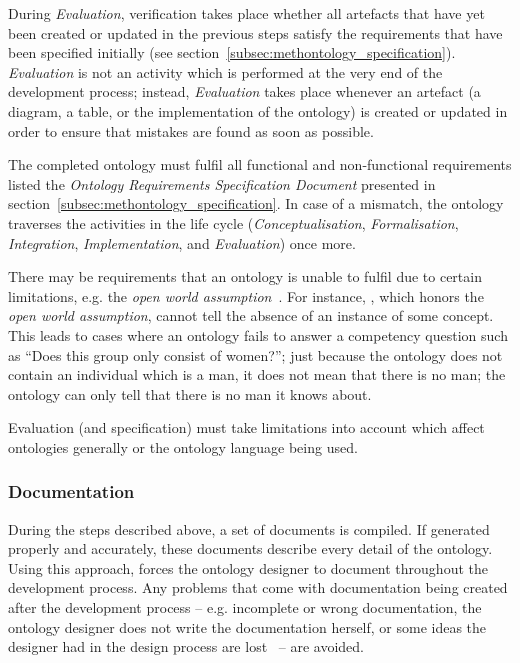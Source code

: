 During \emph{Evaluation}, verification takes place whether all artefacts that have yet been created or updated in the previous steps satisfy the requirements that have been specified initially (see section~\ref{subsec:methontology_specification}). \emph{Evaluation} is not an activity which is performed at the very end of the development process; instead, \emph{Evaluation} takes place whenever an artefact (a diagram, a table, or the implementation of the ontology) is created or updated in order to ensure that mistakes are found as soon as possible.

The completed ontology must fulfil all functional and non-functional requirements listed the \emph{Ontology Requirements Specification Document} presented in section~\ref{subsec:methontology_specification}. In case of a mismatch, the ontology traverses the activities in the life cycle (\emph{Conceptualisation}, \emph{Formalisation}, \emph{Integration}, \emph{Implementation}, and \emph{Evaluation}) once more.

There may be requirements that an ontology is unable to fulfil due to certain limitations, e.g. the \emph{open world assumption}~\cite{open_world_assumption1}. For instance, , which honors the \emph{open world assumption}, cannot tell the absence of an instance of some concept. This leads to cases where an ontology fails to answer a competency question such as ``Does this group only consist of women?''; just because the ontology does not contain an individual which is a man, it does not mean that there is no man; the ontology can only tell that there is no man it knows about.

Evaluation (and specification) must take limitations into account which affect ontologies generally or the ontology language being used.

\subsubsection{Documentation}

During the steps described above, a set of documents is compiled. If generated properly and accurately, these documents describe every detail of the ontology. Using this approach, \methontology forces the ontology designer to document throughout the development process. Any problems that come with documentation being created after the development process -- e.g. incomplete or wrong documentation, the ontology designer does not write the documentation herself, or some ideas the designer had in the design process are lost~\cite{SoftwareDocumentationProblems} -- are avoided.

